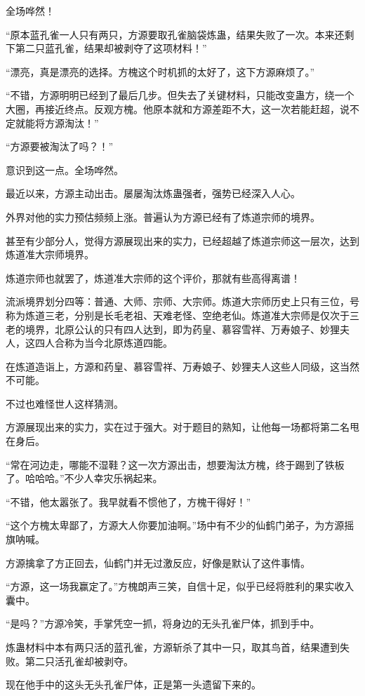 \begin{this_body}
全场哗然！

“原本蓝孔雀一人只有两只，方源要取孔雀脑袋炼蛊，结果失败了一次。本来还剩下第二只蓝孔雀，结果却被剥夺了这项材料！”

“漂亮，真是漂亮的选择。方槐这个时机抓的太好了，这下方源麻烦了。”

“不错，方源明明已经到了最后几步。但失去了关键材料，只能改变蛊方，绕一个大圈，再接近终点。反观方槐。他原本就和方源差距不大，这一次若能赶超，说不定就能将方源淘汰！”

“方源要被淘汰了吗？！”

意识到这一点。全场哗然。

最近以来，方源主动出击。屡屡淘汰炼蛊强者，强势已经深入人心。

外界对他的实力预估频频上涨。普遍认为方源已经有了炼道宗师的境界。

甚至有少部分人，觉得方源展现出来的实力，已经超越了炼道宗师这一层次，达到炼道准大宗师境界。

炼道宗师也就罢了，炼道准大宗师的这个评价，那就有些高得离谱！

流派境界划分四等：普通、大师、宗师、大宗师。炼道大宗师历史上只有三位，号称为炼道三老，分别是长毛老祖、天难老怪、空绝老仙。炼道准大宗师是仅次于三老的境界，北原公认的只有四人达到，即为药皇、慕容雪祥、万寿娘子、妙狸夫人，这四人合称为当今北原炼道四能。

在炼道造诣上，方源和药皇、慕容雪祥、万寿娘子、妙狸夫人这些人同级，这当然不可能。

不过也难怪世人这样猜测。

方源展现出来的实力，实在过于强大。对于题目的熟知，让他每一场都将第二名甩在身后。

“常在河边走，哪能不湿鞋？这一次方源出击，想要淘汰方槐，终于踢到了铁板了。哈哈哈。”不少人幸灾乐祸起来。

“不错，他太嚣张了。我早就看不惯他了，方槐干得好！”

“这个方槐太卑鄙了，方源大人你要加油啊。”场中有不少的仙鹤门弟子，为方源摇旗呐喊。

方源擒拿了方正回去，仙鹤门并无过激反应，好像是默认了这件事情。

“方源，这一场我赢定了。”方槐朗声三笑，自信十足，似乎已经将胜利的果实收入囊中。

“是吗？”方源冷笑，手掌凭空一抓，将身边的无头孔雀尸体，抓到手中。

炼蛊材料中本有两只活的蓝孔雀，方源斩杀了其中一只，取其鸟首，结果遭到失败。第二只活孔雀却被剥夺。

现在他手中的这头无头孔雀尸体，正是第一头遗留下来的。


\end{this_body}
